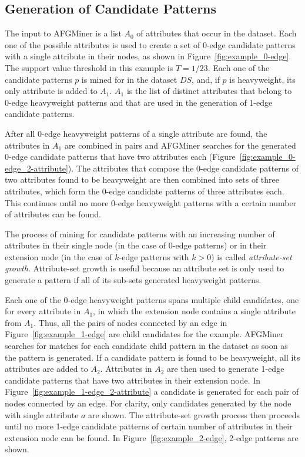 \subsection{Generation of Candidate Patterns}
The input to AFGMiner is a list $A_0$ of attributes that occur in the dataset. Each one of the possible attributes is used to create a set of 0-edge candidate patterns with a single attribute in their nodes, as shown in Figure~\ref{fig:example_0-edge}. The support value threshold in this example is $T = 1/23$. Each one of the candidate patterns $p$ is mined for in the dataset $DS$, and, if $p$ is heavyweight, its only attribute is added to $A_1$. $A_1$ is the list of distinct attributes that belong to 0-edge heavyweight patterns and that are used in the generation of 1-edge candidate patterns. 

After all 0-edge heavyweight patterns of a single attribute are found, the attributes in $A_1$ are combined in pairs and AFGMiner searches for the generated 0-edge candidate patterns that have two attributes each (Figure~\ref{fig:example_0-edge_2-attribute}). The attributes that compose the 0-edge candidate patterns of two attributes found to be heavyweight are then combined into sets of three attributes, which form the 0-edge candidate patterns of three attributes each. This continues until no more 0-edge heavyweight patterns with a certain number of attributes can be found. 

The process of mining for candidate patterns with an increasing number of attributes in their single node (in the case of 0-edge patterns) or in their extension node (in the case of $k$-edge patterns with $k > 0$) is called \emph{attribute-set growth}. Attribute-set growth is useful because an attribute set is only used to generate a pattern if all of its sub-sets generated heavyweight patterns. 

Each one of the 0-edge heavyweight patterns spans multiple child candidates, one for every attribute in $A_1$, in which the extension node contains a single attribute from $A_1$. Thus, all the pairs of nodes connected by an edge in Figure~\ref{fig:example_1-edge} are child candidates for the example. AFGMiner searches for matches for each candidate child pattern in the dataset as soon as the pattern is generated. If a candidate pattern is found to be heavyweight, all its attributes are added to $A_2$. Attributes in $A_2$ are then used to generate 1-edge candidate patterns that have two attributes in their extension node.  In Figure~\ref{fig:example_1-edge_2-attribute} a candidate is generated for each pair of nodes connected by an edge. For clarity, only candidates generated by the node with single attribute $a$ are shown. The attribute-set growth process then proceeds until no more 1-edge candidate patterns of certain number of attributes in their extension node can be found. In Figure~\ref{fig:example_2-edge}, 2-edge patterns are shown. 

